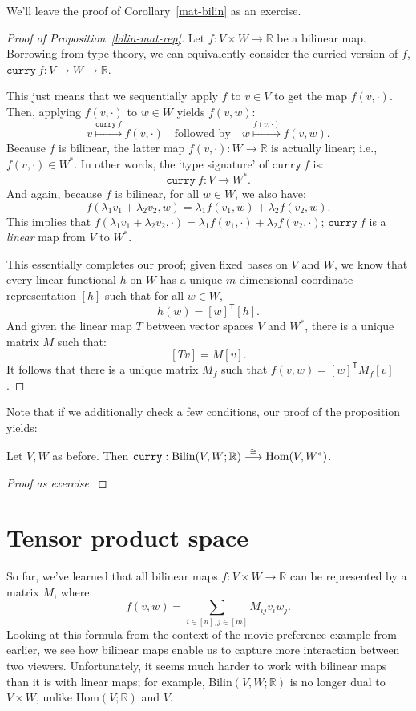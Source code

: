 We'll leave the proof of Corollary~\ref{mat-bilin} as an exercise. 
\begin{proof}[Proof of Proposition~\ref{bilin-mat-rep}]
  Let $f : V \times W \to \mathbb{R}$ be a bilinear map. Borrowing from type theory, we can equivalently consider the curried version of $f$, $\texttt{curry}\ f : V \to W \to \mathbb{R}$.

  This just means that we sequentially apply $f$ to $v \in V$ to get  the map $f(v,\cdot)$. Then, applying $f(v,\cdot)$ to $w \in W$ yields $f(v,w)$:
  \[v \overset{\texttt{curry}\ f}{\longmapsto} f(v, \cdot) \quad \textrm{followed by} \quad w \overset{f(v,\cdot)}{\longmapsto} f(v,w).\]
  Because $f$ is bilinear, the latter map $f(v, \cdot) : W \to \mathbb{R}$ is actually linear; i.e., $f(v,\cdot) \in W^*$. In other words, the `type signature' of $\texttt{curry}\ f$ is:
  \[\texttt{curry}\ f : V \to W^*.\]
  And again, because $f$ is bilinear, for all $w \in W$, we also have:
  \[f(\lambda_1 v_1 + \lambda_2 v_2, w) = \lambda_1 f(v_1, w) + \lambda_2 f(v_2, w).\]
  This implies that $f(\lambda_1 v_1 + \lambda_2 v_2 , \cdot) = \lambda_1 f(v_1, \cdot) + \lambda_2 f(v_2,\cdot)$; $\texttt{curry}\ f$ is a \emph{linear} map from $V$ to $W^*$.

  This essentially completes our proof; given fixed bases on $V$ and $W$, we know that every linear functional $h$ on $W$ has a unique $m$-dimensional coordinate representation $[h]$ such that for all $w \in W$,
  \[h(w) = [w]^\mathsf{T}[h].\]
  And given the linear map $T$ between vector spaces $V$ and $W^*$, there is a unique matrix $M$ such that:
  \[[Tv] = M [v].\]
  It follows that there is a unique matrix $M_f$ such that $f(v,w) = [w]^\mathsf{T} M_f [v]$.
\end{proof}

Note that if we additionally check a few conditions, our proof of the proposition yields:
\begin{corollary}
  Let $V, W$ as before. Then $\textup{\texttt{curry}} : \mathrm{Bilin}(V, W;\mathbb{R}) \overset{\cong}{\longrightarrow} \mathrm{Hom}(V, W^*)$.
\end{corollary}
\begin{proof}[Proof as exercise]
\end{proof}

\section{Tensor product space}
So far, we've learned that all bilinear maps $f : V \times W \to \mathbb{R}$ can be represented by a matrix $M$, where:
\begin{equation}\label{bilinear-map-representation}
  f(v,w) = \sum_{i \in [n], j \in [m]} M_{ij} v_i w_j.
\end{equation}
Looking at this formula from the context of the movie preference example from earlier, we  see how bilinear maps enable us to capture more interaction between two viewers. Unfortunately, it seems much harder to work with bilinear maps than it is with linear maps; for example, $\mathrm{Bilin}(V,W;\mathbb{R})$ is no longer dual to $V \times W$, unlike $\mathrm{Hom}(V;\mathbb{R})$ and $V$.

